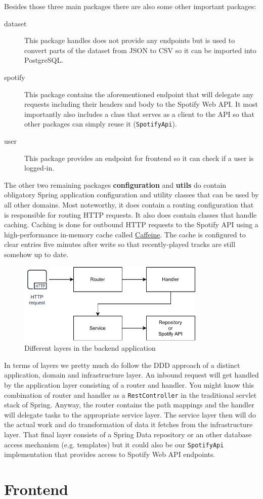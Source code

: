 Besides those three main packages there are also some other important packages:

\begin{description}
    \item[dataset] This package handles does not provide any endpoints but is used to convert parts of the dataset from \acs{JSON} to \acs{CSV} so it can be imported into PostgreSQL.
    \item[spotify] This package contains the aforementioned endpoint that will delegate any requests including their headers and body to the Spotify Web API. It most importantly also includes a class that serves as a client to the API so that other packages can simply reuse it (\texttt{SpotifyApi}).
    \item[user] This package provides an endpoint for frontend so it can check if a user is logged-in.
\end{description}

The other two remaining packages \textbf{configuration} and \textbf{utils} do contain obligatory Spring application configuration and utility classes that can be used by all other domains. Most noteworthy, it does contain a routing configuration that is responsible for routing \ac{HTTP} requests. It also does contain classes that handle caching. Caching is done for outbound \ac{HTTP} requests to the Spotify API using a high-performance in-memory cache called \href{https://github.com/ben-manes/caffeine}{Caffeine}. The cache is configured to clear entries five minutes after write so that recently-played tracks are still somehow up to date.

\begin{figure}[bth]
    \centering
    \includegraphics[width=0.8\textwidth]{Graphics/Chapter3/backend-layers.pdf}
    \caption{Different layers in the backend application}
\end{figure}

In terms of layers we pretty much do follow the \ac{DDD} approach of a distinct application, domain and infrastructure layer. An inbound request will get handled by the application layer consisting of a router and handler. You might know this combination of router and handler as a \texttt{RestController} in the traditional servlet stack of Spring. Anyway, the router contains the path mappings and the handler will delegate tasks to the appropriate service layer. The service layer then will do the actual work and do transformation of data it fetches from the infrastructure layer. That final layer consists of a Spring Data repository or an other database access mechanism (e.g. templates) but it could also be our \texttt{SpotifyApi} implementation that provides access to Spotify Web API endpoints.

\section{Frontend}

